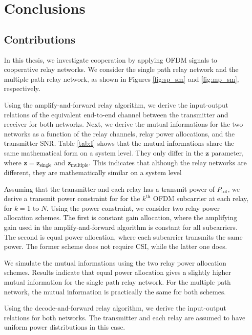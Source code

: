 \chapter{Conclusions}
\label{chap:conclusion}

\section{Contributions}
In this thesis, we investigate cooperation by applying OFDM signals to cooperative relay networks.  We consider the single path relay network and the multiple path relay network, as shown in Figures \ref{fig:sp_sm} and \ref{fig:mp_sm}, respectively.  

Using the amplify-and-forward relay algorithm, we derive the input-output relations of the equivalent end-to-end channel between the transmitter and receiver for both networks.  Next, we derive the mutual informations for the two networks as a function of the relay channels, relay power allocations, and the transmitter SNR.  Table \ref{tab:I} shows that the mutual informations share the same mathematical form on a system level.  They only differ in the $\mathbf{z}$ parameter, where $\mathbf{z} = \mathbf{z}_{\mbox{single}}$ and $\mathbf{z}_{\mbox{multiple}}$.  This indicates that although the relay networks are different, they are mathematically similar on a system level

Assuming that the transmitter and each relay has a transmit power of $P_{\mbox{tot}}$, we derive a transmit power constraint for for the $k^{\mbox{th}}$ OFDM subcarrier at each relay, for $k = 1$ to $N$.  Using the power constraint, we consider two relay power allocation schemes.  The first is constant gain allocation, where the amplifying gain used in the amplify-and-forward algorithm is constant for all subcarriers.  The second is equal power allocation, where each subcarrier transmits the same power.  The former scheme does not require CSI, while the latter one does.

We simulate the mutual informations using the two relay power allocation schemes.  Results indicate that equal power allocation gives a slightly higher mutual information for the single path relay network.  For the multiple path network, the mutual information is practically the same for both schemes.

Using the decode-and-forward relay algorithm, we derive the input-output relations for both networks.  The transmitter and each relay are assumed to have uniform power distributions in this case.

